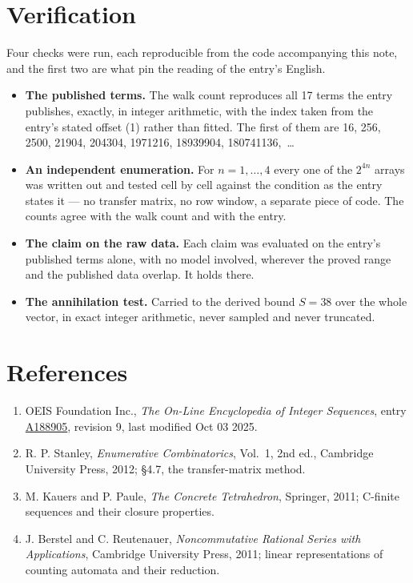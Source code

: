 \documentclass[11pt]{article}
\theoremstyle{definition}
\begin{document}
\section{Verification}

Four checks were run, each reproducible from the code accompanying this note, and the first two are what pin the reading of the entry's English.

\begin{itemize}

\item {\bfseries The published terms.} The walk count reproduces all 17 terms the entry publishes, exactly, in integer arithmetic, with the index taken from the entry's stated offset (1) rather than fitted. The first of them are 16, 256, 2500, 21904, 204304, 1971216, 18939904, 180741136,~\dots

\item {\bfseries An independent enumeration.} For $n = 1,\dots,4$ every one of the $2^{4n}$ arrays was written out and tested cell by cell against the condition as the entry states it --- no transfer matrix, no row window, a separate piece of code. The counts agree with the walk count and with the entry.

\item {\bfseries The claim on the raw data.} Each claim was evaluated on the entry's published terms alone, with no model involved, wherever the proved range and the published data overlap. It holds there.

\item {\bfseries The annihilation test.} Carried to the derived bound $S = 38$ over the whole vector, in exact integer arithmetic, never sampled and never truncated.

\end{itemize}

\section{References}

\begin{enumerate}

\item OEIS Foundation Inc., \emph{The On-Line Encyclopedia of Integer Sequences}, entry \href{https://oeis.org/A188905}{A188905}, revision 9, last modified Oct 03 2025.

\item R. P. Stanley, \emph{Enumerative Combinatorics}, Vol.~1, 2nd ed., Cambridge University Press, 2012; \S4.7, the transfer-matrix method.

\item M. Kauers and P. Paule, \emph{The Concrete Tetrahedron}, Springer, 2011; C-finite sequences and their closure properties.

\item J. Berstel and C. Reutenauer, \emph{Noncommutative Rational Series with Applications}, Cambridge University Press, 2011; linear representations of counting automata and their reduction.

\end{enumerate}
\end{document}
